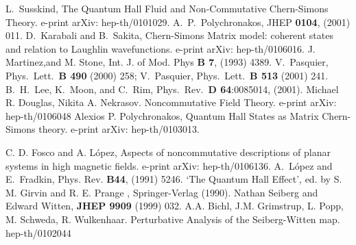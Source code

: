 \documentclass[a4paper,12pt]{article}
\begin{document}
\newpage
\begin{thebibliography}{99}
L.~Susskind, The Quantum Hall Fluid and Non-Commutative
Chern-Simons Theory. e-print arXiv: hep-th/0101029.
A.~P.~Polychronakos, JHEP {\bf 0104}, (2001) 011.
D.~Karabali and B.~Sakita, Chern-Simons Matrix model: coherent states
and relation to Laughlin wavefunctions. e-print arXiv: hep-th/0106016.
J. Martinez,and  M. Stone,  Int. J. of Mod. Phys {\bf B 7}, 
(1993) 4389.
V.~Pasquier, Phys.~Lett.~{\bf B 490} (2000) 258;
 V.~Pasquier, Phys.~Lett.~{\bf B 513} (2001) 241.
B.~H.~Lee, K.~Moon, and C.~Rim, Phys.~Rev.~{\bf D 64}:0085014, 
(2001).
 Michael R. Douglas, Nikita A. Nekrasov.
 Noncommutative Field Theory. e-print arXiv: hep-th/0106048
 Alexios P. Polychronakos, Quantum Hall States as Matrix Chern-Simons theory.
e-print arXiv: hep-th/0103013.
 
C. D. Fosco and A. L{\'o}pez, Aspects of noncommutative
descriptions of planar systems in high magnetic fields. e-print arXiv:
hep-th/0106136.
A.~L{\'o}pez and E.~Fradkin, Phys. Rev. {\bf B44}, 
(1991) 5246.
`The Quantum Hall Effect', ed. by S. M. Girvin and R. E. Prange ,
Springer-Verlag (1990).
 Nathan Seiberg and Edward Witten, {\bf JHEP 9909} (1999) 032.
 A.A. Bichl, J.M. Grimstrup, L. Popp, M. Schweda, R.
 Wulkenhaar. Perturbative Analysis of the Seiberg-Witten map. hep-th/0102044
\end{thebibliography}
\end{document}
